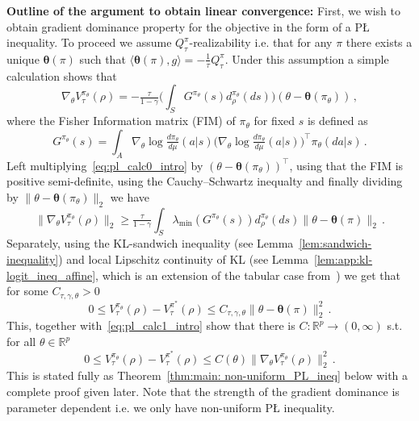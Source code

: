 \documentclass{amsart}
\theoremstyle{definition}
\begin{document}
\textbf{Outline of the argument to obtain linear convergence:} 
First, we wish to obtain gradient dominance property for the objective in the form of a P{\L} inequality.
To proceed we assume $Q^\pi_\tau$-realizability i.e. that for any $\pi$ there exists a unique $\boldsymbol{{\theta}}(\pi)$ such that $\langle \boldsymbol{{\theta}}(\pi), g \rangle = -\tfrac{1}{\tau} Q^{\pi}_\tau$. 
Under this assumption a simple calculation shows that 
\begin{equation}
\label{eq:pl_calc0_intro}
\nabla_\theta V^{\pi_\theta}_\tau(\rho) = -\tfrac{\tau}{1-\gamma} \Big( \textstyle\int_S G^{\pi_\theta}(s)d^{\pi_\theta}_\rho(ds)\Big)(\theta - \boldsymbol{{\theta}}(\pi_\theta))\,,
\end{equation}
where the Fisher Information matrix (FIM) of $\pi_\theta$ for fixed $s$ is defined as
\begin{equation}\label
{eq:intro:FIM}
G^{\pi_\theta}(s) = \textstyle\int_A \nabla_\theta \log \tfrac{d \pi_{\theta}}{d \mu}(a|s)\big(\nabla_\theta \log \tfrac{d \pi_{\theta}}{d \mu}(a|s)\big)^{\top}\pi_{\theta}(da|s)\,.
\end{equation}
Left multiplying~\eqref{eq:pl_calc0_intro} by $(\theta-\boldsymbol{\theta}(\pi_\theta))^\top$, using that the FIM is positive semi-definite, using the Cauchy--Schwartz inequalty and finally dividing by $\|\theta-\boldsymbol{\theta}(\pi_\theta)\|_2$ we have
\begin{equation}
\label{eq:pl_calc1_intro}
\|\nabla_\theta V^{\pi_\theta}_\tau(\rho)\|_2 \geq \tfrac{\tau}{1-\gamma}  \textstyle\int_S \lambda_{\text{min}}(G^{\pi_\theta}(s)) d^{\pi_\theta}_\rho(ds)\|\theta - \boldsymbol{{\theta}}(\pi)\|_2\,.
\end{equation}
Separately, using the KL-sandwich inequality (see Lemma~\ref{lem:sandwich-inequality}) and local Lipschitz continuity of KL (see Lemma~\ref{lem:app:kl-logit_ineq_affine}, which is an extension of the tabular case from~\cite[Lemma 27]{mei2020global}) we get that for some $C_{\tau,\gamma,\theta}>0$
\[
0 \leq V_\tau^{\pi_{\theta}}(\rho)-V_\tau^{\pi^*}(\rho) \leq C_{\tau,\gamma,\theta} \|\theta - \boldsymbol{{\theta}}(\pi)\|_2^2\,.
\]
This, together with~\eqref{eq:pl_calc1_intro} 
show that there is $ C: \mathbb{R}^p \to (0, \infty)$ s.t. for all
$\theta \in \mathbb{R}^p$
\begin{equation}
\label{eq:pl_ineq_intro}
0 \leq V_\tau^{\pi_{\theta}}(\rho)-V_\tau^{\pi^*}(\rho) \leq  C(\theta)\|\nabla_\theta V^{\pi_\theta}_\tau(\rho)\|_2^2 \,.
\end{equation}
This is stated fully as Theorem~\ref{thm:main: non-uniform_PL_ineq} below with a complete proof given later.
Note that the strength of the gradient dominance is parameter dependent i.e. we only have non-uniform P{\L} inequality.
\end{document}

